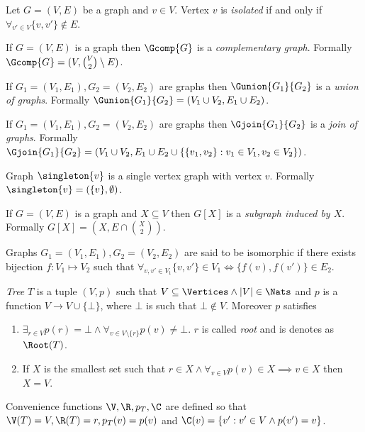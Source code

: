 \begin{defi}
    Let $G = (V,E)$ be a graph and $v \in V$. Vertex $v$ is \emph{isolated} if and only if $\forall_{v' \in V} \{v,v'\} \not\in E$.
\end{defi}

\begin{defi}
    If $G = (V, E)$ is a graph then $\Gcomp{G}$ is a \emph{complementary graph}. Formally $\Gcomp{G} = (V, \binom{V}{2} \setminus E)$.
\end{defi}
\begin{defi}
    If $G_1 = (V_1, E_1), G_2 = (V_2, E_2)$ are graphs then $\Gunion{G_1}{G_2}$ is a \emph{union of graphs}. Formally $\Gunion{G_1}{G_2} = (V_1 \cup V_2, E_1 \cup E_2)$.
\end{defi}
\begin{defi}
    If $G_1 = (V_1, E_1), G_2 = (V_2, E_2)$ are graphs then $\Gjoin{G_1}{G_2}$ is a \emph{join of graphs}. Formally $\Gjoin{G_1}{G_2} = (V_1 \cup V_2, E_1 \cup E_2 \cup \{\{v_1,v_2\} : v_1 \in V_1, v_2 \in V_2\})$.
\end{defi}

\begin{defi}
    Graph $\singleton{v}$ is a single vertex graph with vertex $v$. Formally $\singleton{v} = (\{v\}, \emptyset)$.
\end{defi}

\begin{defi}
    If $G = (V,E)$ is a graph and $X \subseteq V$ then $G[X]$ is a \emph{subgraph induced by $X$}. Formally $G[X] = (X, E \cap \binom{X}{2})$.
\end{defi}

\begin{defi}
    Graphs $G_1 = (V_1, E_1), G_2 = (V_2, E_2)$ are said to be isomorphic if there exists bijection $f\colon V_1 \mapsto V_2$ such that $\forall_{v, v' \in V_1} \{v,v'\} \in V_1 \iff \{f(v), f(v')\} \in E_2$.
\end{defi}

\begin{defi}
    \emph{Tree} $T$ is a tuple $(V, p)$ such that $V \subseteq \Vertices \land |V| \in \Nats$ and $p$ is a function $V \to V \cup \{\bot\}$, where $\bot$ is such that $\bot \not\in V$. Moreover $p$ satisfies
    \begin{enumerate}
        \item $\exists_{r \in V} p(r) = \bot \land \forall_{v \in V\setminus\{r\}} p(v) \neq \bot$. $r$ is called \emph{root} and is denotes as $\Root(T)$.
        \item If $X$ is the smallest set such that $r \in X \land \forall_{v \in V} p(v) \in X \implies v \in X$ then $X = V$.
    \end{enumerate}
    Convenience functions $\V, \R, p_T, \C$ are defined so that $\V(T) = V, \R(T) = r, p_T(v) = p(v)$ and $\C(v) = \{v' : v' \in V \land p(v') = v\}$.
\end{defi}

